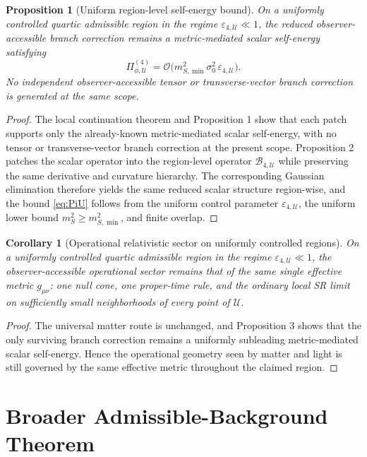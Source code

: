 \documentclass[11pt]{article}
\newtheorem{proposition}{Proposition}
\newtheorem{corollary}{Corollary}
\begin{document}
\begin{proposition}[Uniform region-level self-energy bound]
On a uniformly controlled quartic admissible region in the regime \(\varepsilon_{4,\mathcal U}\ll 1\), the reduced observer-accessible branch correction remains a metric-mediated scalar self-energy satisfying
\begin{equation}
\Pi_{\phi,\mathcal U}^{(4)}
=
\mathcal O\!\bigl(m_{S,\min}^2\sigma_0^2\,\varepsilon_{4,\mathcal U}\bigr).
\label{eq:PiU}
\end{equation}
No independent observer-accessible tensor or transverse-vector branch correction is generated at the same scope.
\end{proposition}

\begin{proof}
The local continuation theorem and Proposition 1 show that each patch supports only the already-known metric-mediated scalar self-energy, with no tensor or transverse-vector branch correction at the present scope. Proposition 2 patches the scalar operator into the region-level operator \(\mathcal B_{4,\mathcal U}\) while preserving the same derivative and curvature hierarchy. The corresponding Gaussian elimination therefore yields the same reduced scalar structure region-wise, and the bound \eqref{eq:PiU} follows from the uniform control parameter \(\varepsilon_{4,\mathcal U}\), the uniform lower bound \(m_S^2\ge m_{S,\min}^2\), and finite overlap.
\end{proof}

\begin{corollary}[Operational relativistic sector on uniformly controlled regions]
On a uniformly controlled quartic admissible region in the regime \(\varepsilon_{4,\mathcal U}\ll 1\), the observer-accessible operational sector remains that of the same single effective metric \(g_{\mu\nu}\): one null cone, one proper-time rule, and the ordinary local SR limit on sufficiently small neighborhoods of every point of \(\mathcal U\).
\end{corollary}

\begin{proof}
The universal matter route is unchanged, and Proposition 3 shows that the only surviving branch correction remains a uniformly subleading metric-mediated scalar self-energy. Hence the operational geometry seen by matter and light is still governed by the same effective metric throughout the claimed region.
\end{proof}

\section{Broader Admissible-Background Theorem}
\end{document}

